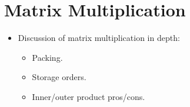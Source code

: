 \documentclass[\main/thesis.tex]{subfiles}
\begin{document}
\chapter{Matrix Multiplication}
\label{cha:matmul}

\begin{itemize}
  \item
    Discussion of matrix multiplication in depth:
    \begin{itemize}
      \item Packing.
      \item Storage orders.
      \item Inner/outer product pros/cons.
    \end{itemize}
\end{itemize}
\end{document}
